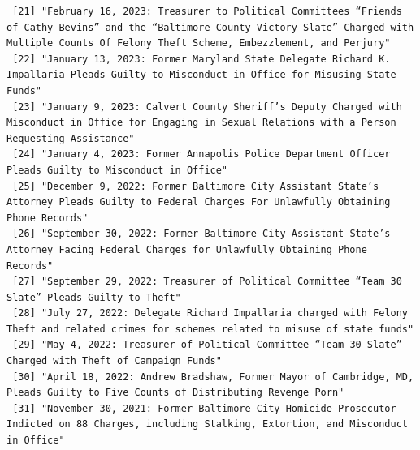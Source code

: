 \documentclass[
  letterpaper,
  DIV=11,
  numbers=noendperiod]{scrreprt}
\begin{document}
\begin{verbatim}
 [21] "February 16, 2023: Treasurer to Political Committees “Friends of Cathy Bevins” and the “Baltimore County Victory Slate” Charged with Multiple Counts Of Felony Theft Scheme, Embezzlement, and Perjury"                                              
 [22] "January 13, 2023: Former Maryland State Delegate Richard K. Impallaria Pleads Guilty to Misconduct in Office for Misusing State Funds"                                                                                                               
 [23] "January 9, 2023: Calvert County Sheriff’s Deputy Charged with Misconduct in Office for Engaging in Sexual Relations with a Person Requesting Assistance"                                                                                             
 [24] "January 4, 2023: Former Annapolis Police Department Officer Pleads Guilty to Misconduct in Office"                                                                                                                                                   
 [25] "December 9, 2022: Former Baltimore City Assistant State’s Attorney Pleads Guilty to Federal Charges For Unlawfully Obtaining Phone Records"                                                                                                          
 [26] "September 30, 2022: Former Baltimore City Assistant State’s Attorney Facing Federal Charges for Unlawfully Obtaining Phone Records"                                                                                                                  
 [27] "September 29, 2022: Treasurer of Political Committee “Team 30 Slate” Pleads Guilty to Theft"                                                                                                                                                         
 [28] "July 27, 2022: Delegate Richard Impallaria charged with Felony Theft and related crimes for schemes related to misuse of state funds"                                                                                                                
 [29] "May 4, 2022: Treasurer of Political Committee “Team 30 Slate” Charged with Theft of Campaign Funds"                                                                                                                                                  
 [30] "April 18, 2022: Andrew Bradshaw, Former Mayor of Cambridge, MD, Pleads Guilty to Five Counts of Distributing Revenge Porn"                                                                                                                           
 [31] "November 30, 2021: Former Baltimore City Homicide Prosecutor Indicted on 88 Charges, including Stalking, Extortion, and Misconduct in Office"                                                                                                        

\end{verbatim}
\end{document}
